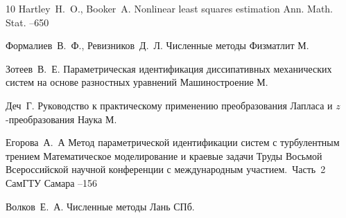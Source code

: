 \begin{thebibliography}{10}
\by Hartley~H.~O., Booker~A.  
\paper Nonlinear least squares estimation
\jour Ann. Math. Stat.
--650 



\by Формалиев~В.~Ф., Ревизников~Д.~Л. 
\book Численные методы
\publ Физматлит
\publaddr М.


\by Зотеев~В.~Е. 
\book Параметрическая идентификация диссипативных механических систем на основе разностных уравнений
\publ Машиностроение
\publaddr М.


\by Деч~Г. 
\book Руководство к практическому применению преобразования Лапласа и  $z$-преобразования
\publ Наука
\publaddr М.

\by Егорова~А.~А  
\paper Метод параметрической идентификации систем с турбулентным трением
\inbook Математическое моделирование и краевые задачи
\bookinfo Труды Восьмой Всероссийской научной конференции с международным участием.~Часть~2
\publ СамГТУ
\publaddr Самара
--156

\by Волков~Е.~А.  
\book Численные методы
\publ Лань
\publaddr СПб.


\end{thebibliography}
